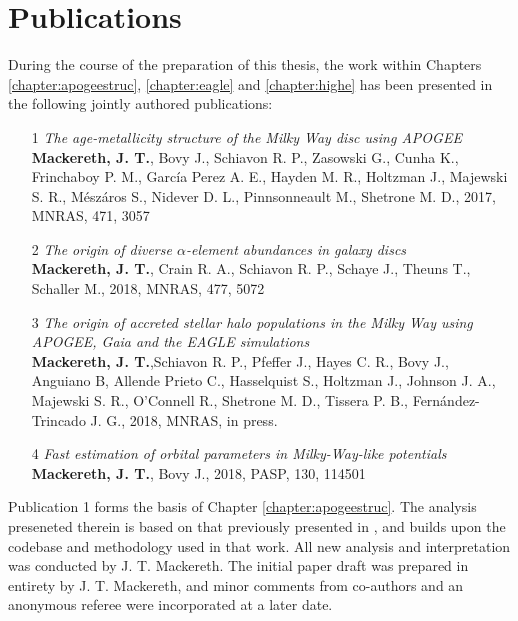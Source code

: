 \chapter*{Publications}

During the course of the preparation of this thesis, the work within Chapters \ref{chapter:apogeestruc},  \ref{chapter:eagle} and \ref{chapter:highe} has been presented in the following jointly authored publications:

\begin{itemize}

\item[1] {\it The age-metallicity structure of the Milky Way disc using APOGEE} \\
{\bf Mackereth, J. T.}, Bovy J., Schiavon R. P., Zasowski G., Cunha K., Frinchaboy P. M., Garc\'ia Perez A. E., Hayden M. R., Holtzman J., Majewski S. R., M\'esz\'aros S., Nidever D. L., Pinnsonneault M., Shetrone M. D., 2017, MNRAS, 471, 3057

\item[2] {\it The origin of diverse $\alpha$-element abundances in galaxy discs} \\
{\bf Mackereth, J. T.}, Crain R. A., Schiavon R. P., Schaye J., Theuns T., Schaller M., 2018, MNRAS, 477, 5072

\item[3] {\it The origin of accreted stellar halo populations in the Milky Way using APOGEE, Gaia and the EAGLE simulations} \\
{\bf Mackereth, J. T.},Schiavon R. P., Pfeffer J., Hayes C. R., Bovy J., Anguiano B, Allende Prieto C., Hasselquist S., Holtzman J., Johnson J. A., Majewski S. R., O'Connell R., Shetrone M. D., Tissera P. B., Fernández-Trincado J. G., 2018, MNRAS, in press.


\item[4] {\it Fast estimation of orbital parameters in Milky-Way-like potentials} \\
{\bf Mackereth, J. T.}, Bovy J., 2018, PASP, 130, 114501

\end{itemize}

Publication 1 forms the basis of Chapter \ref{chapter:apogeestruc}. The analysis preseneted therein is based on that previously presented in \citet{2016ApJ...823...30B}, and builds upon the codebase and methodology used in that work. All new analysis and interpretation was conducted by J. T. Mackereth. The initial paper draft was prepared in entirety by J. T. Mackereth, and minor comments from co-authors and an anonymous referee were incorporated at a later date.

